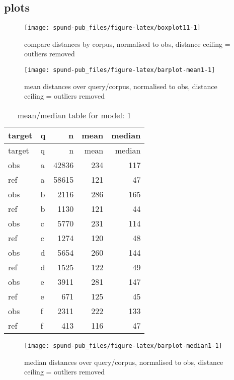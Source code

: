 \documentclass[
  12pt,
  oneside]{book}
\begin{document}
\subsection{plots}\label{plots}

\begin{figure}[H]
\texttt{[image: spund-pub\_files/figure-latex/boxplot11-1]} \caption{compare distances by corpus, normalised to obs, distance ceiling =  outliers removed}\label{fig:boxplot11}
\end{figure}

\begin{figure}[H]
\texttt{[image: spund-pub\_files/figure-latex/barplot-mean1-1]} \caption{mean distances over query/corpus, normalised to obs, distance ceiling =  outliers removed}\label{fig:barplot-mean1}
\end{figure}

\begin{longtable}[]{@{}llrrr@{}}
\caption{\label{tab:dfe-table1}mean/median table for model: 1}\tabularnewline
\toprule\noalign{}
target & q & n & mean & median \\
\midrule\noalign{}
\endfirsthead
\toprule\noalign{}
target & q & n & mean & median \\
\midrule\noalign{}
\endhead
\bottomrule\noalign{}
\endlastfoot
obs & a & 42836 & 234 & 117 \\
ref & a & 58615 & 121 & 47 \\
obs & b & 2116 & 286 & 165 \\
ref & b & 1130 & 121 & 44 \\
obs & c & 5770 & 231 & 114 \\
ref & c & 1274 & 120 & 48 \\
obs & d & 5654 & 260 & 144 \\
ref & d & 1525 & 122 & 49 \\
obs & e & 3911 & 281 & 147 \\
ref & e & 671 & 125 & 45 \\
obs & f & 2311 & 222 & 133 \\
ref & f & 413 & 116 & 47 \\
\end{longtable}

\begin{figure}[H]
\texttt{[image: spund-pub\_files/figure-latex/barplot-median1-1]} \caption{median distances over query/corpus, normalised to obs, distance ceiling =  outliers removed}\label{fig:barplot-median1}
\end{figure}
\end{document}

